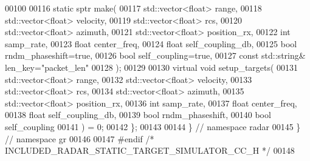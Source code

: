 \begin{DoxyCode}
00100 
00116             \textcolor{keyword}{static} sptr make(
00117                     std::vector<float> range,
00118                     std::vector<float> velocity,
00119                     std::vector<float> rcs,
00120                     std::vector<float> azimuth,
00121                     std::vector<float> position\_rx,
00122                     \textcolor{keywordtype}{int} samp_rate,
00123                     \textcolor{keywordtype}{float} center_freq,
00124                     \textcolor{keywordtype}{float} self\_coupling\_db,
00125                     \textcolor{keywordtype}{bool} rndm\_phaseshift=\textcolor{keyword}{true},
00126                     \textcolor{keywordtype}{bool} self\_coupling=\textcolor{keyword}{true},
00127                     \textcolor{keyword}{const} std::string& len\_key=\textcolor{stringliteral}{"packet\_len"}
00128             );
00129 
00130             \textcolor{keyword}{virtual} \textcolor{keywordtype}{void} setup\_targets(
00131                     std::vector<float> range,
00132                     std::vector<float> velocity,
00133                     std::vector<float> rcs,
00134                     std::vector<float> azimuth,
00135                     std::vector<float> position\_rx,
00136                     \textcolor{keywordtype}{int} samp_rate,
00137                     \textcolor{keywordtype}{float} center_freq,
00138                     \textcolor{keywordtype}{float} self\_coupling\_db,
00139                     \textcolor{keywordtype}{bool} rndm\_phaseshift,
00140                     \textcolor{keywordtype}{bool} self\_coupling
00141                     ) = 0;
00142         \};
00143 
00144     \} \textcolor{comment}{// namespace radar}
00145 \} \textcolor{comment}{// namespace gr}
00146 
00147 \textcolor{preprocessor}{#endif }\textcolor{comment}{/* INCLUDED\_RADAR\_STATIC\_TARGET\_SIMULATOR\_CC\_H */}\textcolor{preprocessor}{}
00148 
\end{DoxyCode}
